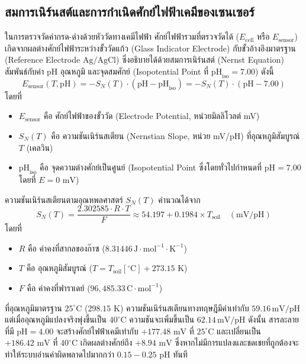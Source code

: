 \subsection{สมการเนิร์นสต์และการกำเนิดศักย์ไฟฟ้าเคมีของเซนเซอร์}
ในการตรวจวัดค่ากรด-ด่างด้วยหัววัดทางเคมีไฟฟ้า ศักย์ไฟฟ้ารวมที่ตรวจวัดได้ ($E_{\text{cell}}$ หรือ $E_{\text{sensor}}$) เกิดจากผลต่างศักย์ไฟฟ้าระหว่างขั้ววัดแก้ว (Glass Indicator Electrode) กับขั้วอ้างอิงมาตรฐาน (Reference Electrode $\text{Ag/AgCl}$) ซึ่งอธิบายได้ด้วยสมการเนิร์นสต์ (Nernst Equation) สัมพันธ์กับค่า pH อุณหภูมิ และจุดสมศักย์ (Isopotential Point ที่ $\text{pH}_{\text{iso}} = 7.00$) ดังนี้
\begin{equation}
E_{\text{sensor}}(T, \text{pH}) = - S_N(T) \cdot (\text{pH} - \text{pH}_{\text{iso}}) = - S_N(T) \cdot (\text{pH} - 7.00)
\label{eq:sensor_potential_mv}
\end{equation}
โดยที่
\begin{itemize}
    \item $E_{\text{sensor}}$ คือ ศักย์ไฟฟ้าของขั้ววัด (Electrode Potential, หน่วยมิลลิโวลต์ mV)
    \item $S_N(T)$ คือ ความชันเนิร์นสเตียน (Nernstian Slope, หน่วย mV/pH) ที่อุณหภูมิสัมบูรณ์ $T$ (เคลวิน)
    \item $\text{pH}_{\text{iso}}$ คือ จุดความต่างศักย์เป็นศูนย์ (Isopotential Point ซึ่งโดยทั่วไปกำหนดที่ $\text{pH} = 7.00$ โดยที่ $E = 0\text{ mV}$)
\end{itemize}

ความชันเนิร์นสเตียนตามอุณหพลศาสตร์ $S_N(T)$ คำนวณได้จาก
\begin{equation}
S_N(T) = \frac{2.302585 \cdot R \cdot T}{F} \approx 54.197 + 0.1984 \times T_{\text{soil}} \quad (\text{mV/pH})
\label{eq:nernst_slope_calc}
\end{equation}
โดยที่
\begin{itemize}
    \item $R$ คือ ค่าคงที่สากลของก๊าซ ($8.31446 \, \text{J}\cdot\text{mol}^{-1}\cdot\text{K}^{-1}$)
    \item $T$ คือ อุณหภูมิสัมบูรณ์ ($T = T_{\text{soil}} [^\circ\text{C}] + 273.15\text{ K}$)
    \item $F$ คือ ค่าคงที่ฟาราเดย์ ($96,485.33 \, \text{C}\cdot\text{mol}^{-1}$)
\end{itemize}

ที่อุณหภูมิมาตรฐาน $25^\circ\text{C}$ ($298.15\text{ K}$) ความชันเนิร์นสเตียนทางทฤษฎีมีค่าเท่ากับ $59.16 \, \text{mV/pH}$ แต่เมื่ออุณหภูมิแปลงจริงพุ่งขึ้นเป็น $40^\circ\text{C}$ ความชันจะเพิ่มขึ้นเป็น $62.14 \, \text{mV/pH}$ ดังนั้น สารละลายที่มี $\text{pH} = 4.00$ จะสร้างศักย์ไฟฟ้าเคมีเท่ากับ $+177.48\text{ mV}$ ที่ $25^\circ\text{C}$ และเปลี่ยนเป็น $+186.42\text{ mV}$ ที่ $40^\circ\text{C}$ เกิดผลต่างศักย์ถึง $+8.94\text{ mV}$ ซึ่งหากไม่มีการแปลงและชดเชยที่ถูกต้องจะทำให้ระบบอ่านค่าผิดพลาดไปมากกว่า $0.15 - 0.25\text{ pH}$ ทันที

